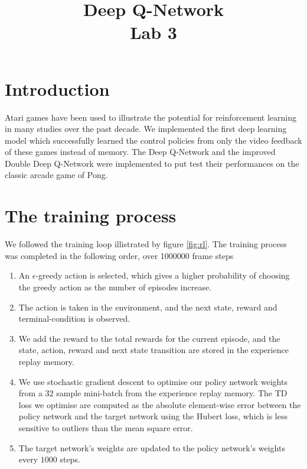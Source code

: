 \documentclass[conference]{IEEEtran}
\begin{document}
\title{Deep Q-Network \\ Lab 3}


 \author{
 \and
 {}
  \and
 {}
   \and
 {}
}

\maketitle
\section{Introduction}

Atari games have been used to illustrate the potential for reinforcement learning in many studies over the past decade. We implemented the first deep learning model which successfully learned the control policies from only the video feedback of these games instead of memory. The Deep Q-Network \cite{mnih2013playing} and the improved Double Deep Q-Network \cite{van2015deep} were implemented to put test their performances on the classic arcade game of Pong.

\section{The training process}
We followed the training loop illistrated by figure \ref{fig:rl}. The training process was completed in the following order, over 1000000 frame steps
\begin{enumerate}
  \item An $\epsilon$-greedy action is selected, which gives a higher probability of choosing the greedy action as the number of episodes increase.
  \item The action is taken in the environment, and the next state, reward and terminal-condition is observed.
  \item We add the reward to the total rewards for the current episode, and the state, action, reward and next state transition are stored in the experience replay memory.
  \item We use stochastic gradient descent to optimise our policy network weights from a $32$ sample mini-batch from the experience replay memory. The TD loss we optimise are computed as the absolute element-wise error between the policy network and the target network using the Hubert loss, which is less sensitive to outliers than the mean square error.
  \item The target network's weights are updated to the policy network's weights every $1000$ steps.
\end{enumerate}
\end{document}
